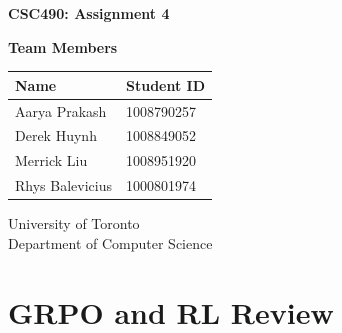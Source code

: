 \documentclass[a4paper,12pt]{article}
\begin{document}
\begin{titlepage}
    \centering
    \vspace*{1cm}
    
    \Huge
    \textbf{CSC490: Assignment 4}
    
    \vspace{0.5cm}
    
    \vspace{1.5cm}
    
    \textbf{Team Members}
    
    \vspace{0.8cm}
    
    \large
    \begin{tabular}{ll}
        \textbf{Name} & \textbf{Student ID} \\
        \midrule
        Aarya Prakash & 1008790257 \\
        Derek Huynh & 1008849052 \\
        Merrick Liu & 1008951920 \\
        Rhys Balevicius & 1000801974 \\
    \end{tabular}
    
    \vfill
    
    \large
    University of Toronto\\
    Department of Computer Science    
\end{titlepage}
\section{GRPO and RL Review}
\end{document}
